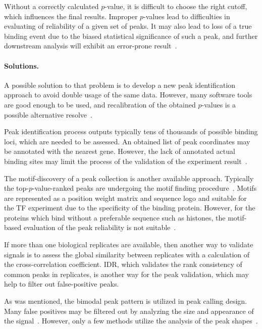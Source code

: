 Without a correctly calculated $p$-value, it is difficult to choose the right cutoff, which influences the final results. 
Improper $p$-values lead to difficulties in evaluating of reliability of a given set of peaks.
It may also lead to loss of a true binding event due to the biased statistical significance of such a peak, and further downstream analysis will exhibit an error-prone result~\cite{chitpin2019recap}. 

\paragraph{Solutions.}
A possible solution to that problem is to develop a new peak identification approach to avoid double usage of the same data. 
However, many software tools are good enough to be used, and recalibration of the obtained $p$-values is a possible alternative resolve~\cite{chitpin2019recap}.


Peak identification process outputs typically tens of thousands of possible binding loci, which are needed to be assessed. 
An obtained list of peak coordinates may be annotated with the nearest gene. 
However, the lack of annotated actual binding sites may limit the process of the validation of the experiment result~\cite{nakato2017recent}.

The motif-discovery of a peak collection is another available approach. 
Typically the top-$p$-value-ranked peaks are undergoing the motif finding procedure~\cite{bailey2011dreme}.
Motifs are represented as a position weight matrix and sequence logo and suitable for the TF experiment due to the specificity of the binding protein.
However, for the proteins which bind without a preferable sequence such as histones, the motif-based evaluation of the peak reliability is not suitable~\cite{nakato2017recent}. 

If more than one biological replicates are available, then another way to validate signals is to assess the global similarity between replicates with a calculation of the cross-correlation coefficient. 
IDR, which validates the rank consistency of common peaks in replicates, is another way for the peak validation, which may help to filter out false-positive peaks. 

As  was mentioned, the bimodal peak pattern is utilized in peak calling design. 
Many false positives may be filtered out by analyzing the size and appearance of the signal~\cite{rye2011manually}. 
However, only a few methods utilize the analysis of the peak shapes~\cite{hower2011shape, wu2014polyapeak}.
